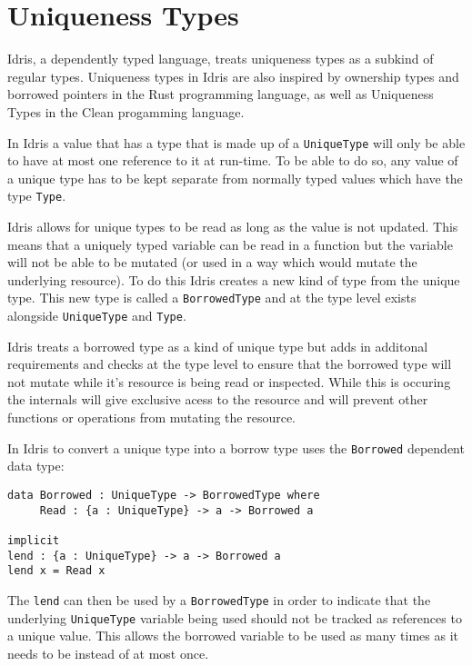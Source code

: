 \documentclass[onehalf,11pt]{beavtex}
\begin{document}
\section{Uniqueness Types}

Idris, a dependently typed language, treats uniqueness types as a subkind of
regular types. Uniqueness types in Idris are also inspired by ownership types
and borrowed pointers in the Rust programming language, as well as Uniqueness
Types in the Clean progamming language. %

In Idris a value that has a type that is made up of a \texttt{UniqueType}
will only be able to have at most one reference to it at run-time.
To be able to do so, any value of a unique type has to be kept separate
from normally typed values which have the type \texttt{Type}. %


Idris allows for unique types to be read as long as the value is not
updated. This means that a uniquely typed variable can be read in a function
but the variable will not be able to be mutated (or used in a way which would
mutate the underlying resource). To do this Idris creates a new kind of type
from the unique type. This new type is called a \texttt{BorrowedType} and at
the type level exists alongside \texttt{UniqueType} and \texttt{Type}.

Idris treats a borrowed type as a kind of unique type but adds in additonal
requirements and checks at the type level to ensure that the borrowed type
will not mutate while it's resource is being read or inspected.  While this
is occuring the internals will give exclusive acess to the resource and will
prevent other functions or operations from mutating the resource.

In Idris to convert a unique type into a borrow type uses the \texttt{Borrowed}
dependent data type:

\begin{verbatim}
data Borrowed : UniqueType -> BorrowedType where
     Read : {a : UniqueType} -> a -> Borrowed a

implicit
lend : {a : UniqueType} -> a -> Borrowed a
lend x = Read x
\end{verbatim}

The \texttt{lend} can then be used by a \texttt{BorrowedType} in order
to indicate that the underlying \texttt{UniqueType} variable being used
should not be tracked as references to a unique value. This allows the
borrowed variable to be used as many times as it needs to be instead
of at most once. 
\end{document}
